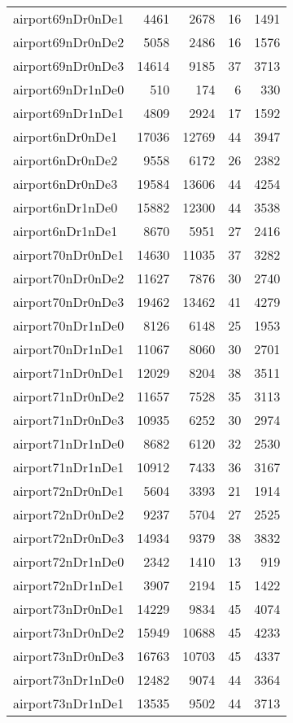 \begin{longtable}{lrrrr}
airport69nDr0nDe1 & 4461 & 2678 & 16 & 1491 \\
airport69nDr0nDe2 & 5058 & 2486 & 16 & 1576 \\
airport69nDr0nDe3 & 14614 & 9185 & 37 & 3713 \\
airport69nDr1nDe0 & 510 & 174 & 6 & 330 \\
airport69nDr1nDe1 & 4809 & 2924 & 17 & 1592 \\
airport6nDr0nDe1 & 17036 & 12769 & 44 & 3947 \\
airport6nDr0nDe2 & 9558 & 6172 & 26 & 2382 \\
airport6nDr0nDe3 & 19584 & 13606 & 44 & 4254 \\
airport6nDr1nDe0 & 15882 & 12300 & 44 & 3538 \\
airport6nDr1nDe1 & 8670 & 5951 & 27 & 2416 \\
airport70nDr0nDe1 & 14630 & 11035 & 37 & 3282 \\
airport70nDr0nDe2 & 11627 & 7876 & 30 & 2740 \\
airport70nDr0nDe3 & 19462 & 13462 & 41 & 4279 \\
airport70nDr1nDe0 & 8126 & 6148 & 25 & 1953 \\
airport70nDr1nDe1 & 11067 & 8060 & 30 & 2701 \\
airport71nDr0nDe1 & 12029 & 8204 & 38 & 3511 \\
airport71nDr0nDe2 & 11657 & 7528 & 35 & 3113 \\
airport71nDr0nDe3 & 10935 & 6252 & 30 & 2974 \\
airport71nDr1nDe0 & 8682 & 6120 & 32 & 2530 \\
airport71nDr1nDe1 & 10912 & 7433 & 36 & 3167 \\
airport72nDr0nDe1 & 5604 & 3393 & 21 & 1914 \\
airport72nDr0nDe2 & 9237 & 5704 & 27 & 2525 \\
airport72nDr0nDe3 & 14934 & 9379 & 38 & 3832 \\
airport72nDr1nDe0 & 2342 & 1410 & 13 & 919 \\
airport72nDr1nDe1 & 3907 & 2194 & 15 & 1422 \\
airport73nDr0nDe1 & 14229 & 9834 & 45 & 4074 \\
airport73nDr0nDe2 & 15949 & 10688 & 45 & 4233 \\
airport73nDr0nDe3 & 16763 & 10703 & 45 & 4337 \\
airport73nDr1nDe0 & 12482 & 9074 & 44 & 3364 \\
airport73nDr1nDe1 & 13535 & 9502 & 44 & 3713 \\

\end{longtable}
